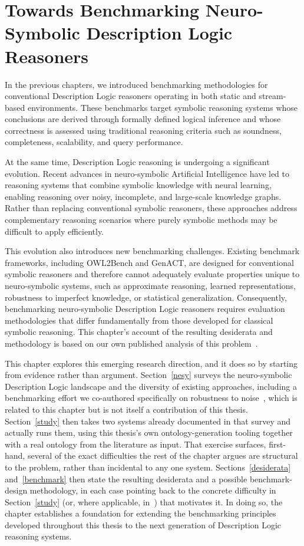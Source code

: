 \chapter{Towards Benchmarking Neuro-Symbolic Description Logic Reasoners}
\label{ch:nesybench}

In the previous chapters, we introduced benchmarking methodologies for conventional Description Logic reasoners operating in both static and stream-based environments. These benchmarks target symbolic reasoning systems whose conclusions are derived through formally defined logical inference and whose correctness is assessed using traditional reasoning criteria such as soundness, completeness, scalability, and query performance.

At the same time, Description Logic reasoning is undergoing a significant evolution. Recent advances in neuro-symbolic Artificial Intelligence have led to reasoning systems that combine symbolic knowledge with neural learning, enabling reasoning over noisy, incomplete, and large-scale knowledge graphs. Rather than replacing conventional symbolic reasoners, these approaches address complementary reasoning scenarios where purely symbolic methods may be difficult to apply efficiently.

This evolution also introduces new benchmarking challenges. Existing benchmark frameworks, including OWL2Bench and GenACT, are designed for conventional symbolic reasoners and therefore cannot adequately evaluate properties unique to neuro-symbolic systems, such as approximate reasoning, learned representations, robustness to imperfect knowledge, or statistical generalization. Consequently, benchmarking neuro-symbolic Description Logic reasoners requires evaluation methodologies that differ fundamentally from those developed for classical symbolic reasoning. This chapter's account of the resulting desiderata and methodology is based on our own published analysis of this problem~\cite{singh2025nesybenchmarking}.

This chapter explores this emerging research direction, and it does so by starting from evidence rather than argument. Section~\ref{nesy} surveys the neuro-symbolic Description Logic landscape and the diversity of existing approaches, including a benchmarking effort we co-authored specifically on robustness to noise~\cite{loesch2024nsorn}, which is related to this chapter but is not itself a contribution of this thesis. Section~\ref{study} then takes two systems already documented in that survey and actually runs them, using this thesis's own ontology-generation tooling together with a real ontology from the literature as input. That exercise surfaces, first-hand, several of the exact difficulties the rest of the chapter argues are structural to the problem, rather than incidental to any one system. Sections~\ref{desiderata} and~\ref{benchmark} then state the resulting desiderata and a possible benchmark-design methodology, in each case pointing back to the concrete difficulty in Section~\ref{study} (or, where applicable, in~\cite{loesch2024nsorn}) that motivates it. In doing so, the chapter establishes a foundation for extending the benchmarking principles developed throughout this thesis to the next generation of Description Logic reasoning systems.

